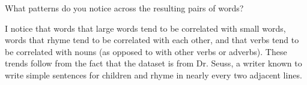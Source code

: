 \problem[2]
What patterns do you notice across the resulting pairs of words?
\begin{solution}
	I notice that words that large words tend to be correlated with small words, words that rhyme tend to be correlated with each other, and that verbs tend to be correlated with nouns (as opposed to with other verbs or adverbs). These trends follow from the fact that the dataset is from Dr. Seuss, a writer known to write simple sentences for children and rhyme in nearly every two adjacent lines.
\end{solution}




